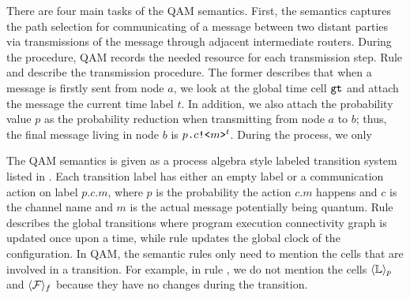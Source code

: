 There are four main tasks of the QAM semantics.
First, the semantics captures the path selection for communicating of a message between two distant parties via transmissions of the message through adjacent intermediate routers. During the procedure, QAM records the needed resource for each transmission step.
Rule  and  describe the transmission procedure.
The former describes that when a message is firstly sent from node $a$, we look at the global time cell $\texttt{gt}$ and attach the message the current time label $t$. In addition, we also attach the probability value $p$ as the probability reduction when transmitting from node $a$ to $b$; thus, the final message living in node $b$ is $p\texttt{.}c\texttt{!<}m\texttt{>}^t$.
During the process, we only 



The QAM semantics is given as a process algebra style labeled transition system listed in .
Each transition label has either an empty label or a communication action on label $p.c.m$, where $p$ is the probability the action $c.m$ happens and $c$ is the channel name and $m$ is the actual message potentially being quantum.
Rule  describes the global transitions where program execution connectivity graph is updated once upon a time,
while rule  updates the global clock of the configuration.
In QAM, the semantic rules only need to mention the cells that are involved in a transition.
For example, in rule , we do not mention the cells $\langle \mathbb{L} \rangle_{p}$ and $\langle \mathcal{F} \rangle_{f}$ because they have no changes during the transition.

